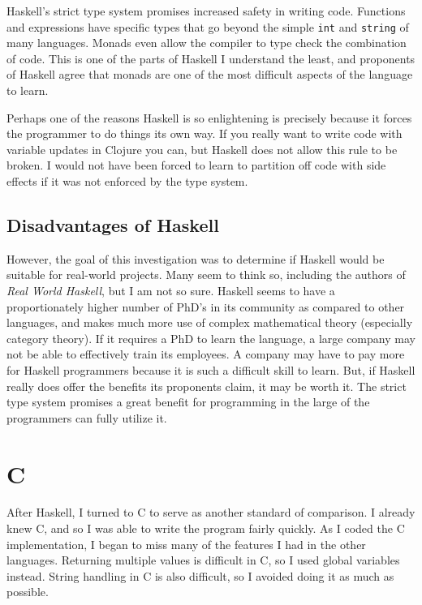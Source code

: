 \documentclass{article}
\begin{document}
Haskell's strict type system promises increased safety in writing code.
Functions and expressions have specific types that go beyond the simple
\texttt{int} and \texttt{string} of many languages.  Monads even allow the
compiler to type check the combination of code.  This is one of the parts of
Haskell I understand the least, and proponents of Haskell agree that monads are
one of the most difficult aspects of the language to learn.

Perhaps one of the reasons Haskell is so enlightening is precisely because it
forces the programmer to do things its own way.  If you really want to write
code with variable updates in Clojure you can, but Haskell does not allow this
rule to be broken.  I would not have been forced to learn to partition off code
with side effects if it was not enforced by the type system.

\subsection{Disadvantages of Haskell}

However, the goal of this investigation was to determine if Haskell would be
suitable for real-world projects.  Many seem to think so, including the authors
of \emph{Real World Haskell}, but I am not so sure.  Haskell seems to have
a proportionately higher number of PhD's in its community as compared to other
languages, and makes much more use of complex mathematical theory (especially
category theory).  If it requires a PhD to learn the language, a large company
may not be able to effectively train its employees.  A company may have to pay
more for Haskell programmers because it is such a difficult skill to learn.
But, if Haskell really does offer the benefits its proponents claim, it may be
worth it.  The strict type system promises a great benefit for programming in
the large of the programmers can fully utilize it.

\section{C}

After Haskell, I turned to C to serve as another standard of comparison.  I
already knew C, and so I was able to write the program fairly quickly.  As I
coded the C implementation, I began to miss many of the features I had in the
other languages.  Returning multiple values is difficult in C, so I used global
variables instead.  String handling in C is also difficult, so I avoided doing
it as much as possible.
\end{document}
